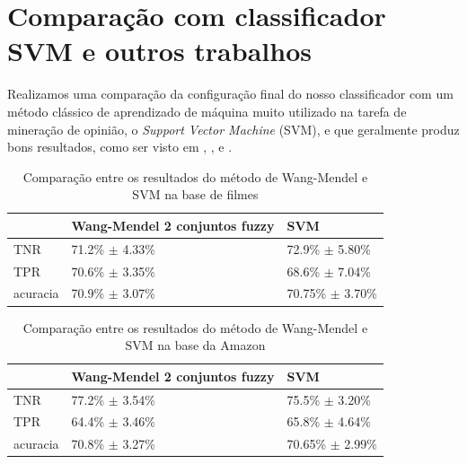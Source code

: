 \documentclass[template.tex]{subfiles}
\begin{document}
\section{Comparação com classificador SVM e outros trabalhos}


Realizamos uma comparação da configuração final do nosso classificador com um método clássico de aprendizado de máquina muito utilizado na tarefa de mineração de opinião, o \textit{Support Vector Machine} (SVM), e que geralmente produz bons resultados, como ser visto em , ,  e . 

\begin{table}[!h]
    \begin{tabular}{lll}
    ~                   & Wang-Mendel 2 conjuntos fuzzy                     & SVM \\ \hline
    TNR                 & 71.2\% $\pm$ 4.33\%                                           & 72.9\% $\pm$ 5.80\%    \\
    TPR             & 70.6\% $\pm$ 3.35\%                                       & 68.6\% $\pm$ 7.04\%   \\
    acuracia        & 70.9\% $\pm$ 3.07\%                                       & 70.75\% $\pm$ 3.70\%    \\
    \end{tabular}
    \caption{Comparação entre os resultados do método de Wang-Mendel e SVM na base de filmes}
    \label{table:movies_svm}
\end{table}

%
%
%

\begin{table}[!h]
    \begin{tabular}{lll}
    ~                       & Wang-Mendel 2 conjuntos fuzzy                             & SVM \\ \hline
    TNR                     & 77.2\% $\pm$ 3.54\%                                               & 75.5\% $\pm$ 3.20\%    \\
    TPR                 & 64.4\% $\pm$ 3.46\%                                               & 65.8\% $\pm$ 4.64\%   \\
    acuracia           & 70.8\% $\pm$ 3.27\%                                            & 70.65\% $\pm$ 2.99\%    \\
    \end{tabular}
    \caption{Comparação entre os resultados do método de Wang-Mendel e SVM na base da Amazon}
    \label{table:amazon_svm}
\end{table}
\end{document}
